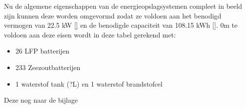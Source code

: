 \noindent Nu de algemene eigenschappen van de energieopslagsystemen compleet in beeld zijn kunnen deze worden omgevormd zodat ze voldoen aan het benodigd vermogen van 22.5 kW \ref{} en de benodigde capaciteit van 108.15 kWh \ref{}. 0m te voldoen aan deze eisen wordt in deze tabel gerekend met:
\begin{itemize}
    \item 26 LFP batterijen
    \item 233 Zeezoutbatterijen
    \item 1 waterstof tank (?L) en 1 waterstof brandstofcel
\end{itemize}

\begin{table}[h]
\centering
\caption{Informatie specifieke energieopslag}
\label{tab:specifieke_energieopslag}
\end{table}

Deze nog naar de bijlage

